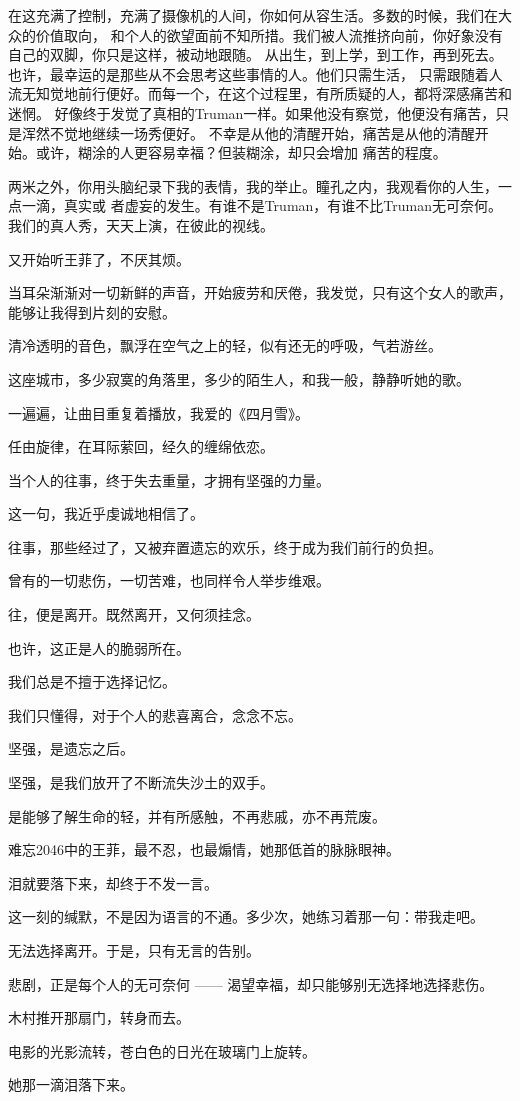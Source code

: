 		在这充满了控制，充满了摄像机的人间，你如何从容生活。多数的时候，我们在大众的价值取向，
	和个人的欲望面前不知所措。我们被人流推挤向前，你好象没有自己的双脚，你只是这样，被动地跟随。
	从出生，到上学，到工作，再到死去。也许，最幸运的是那些从不会思考这些事情的人。他们只需生活，
	只需跟随着人流无知觉地前行便好。而每一个，在这个过程里，有所质疑的人，都将深感痛苦和迷惘。
	好像终于发觉了真相的Truman一样。如果他没有察觉，他便没有痛苦，只是浑然不觉地继续一场秀便好。
	不幸是从他的清醒开始，痛苦是从他的清醒开始。或许，糊涂的人更容易幸福？但装糊涂，却只会增加
	痛苦的程度。

		两米之外，你用头脑纪录下我的表情，我的举止。瞳孔之内，我观看你的人生，一点一滴，真实或
	者虚妄的发生。有谁不是Truman，有谁不比Truman无可奈何。我们的真人秀，天天上演，在彼此的视线。

	\endwriting



		又开始听王菲了，不厌其烦。\par
		当耳朵渐渐对一切新鲜的声音，开始疲劳和厌倦，我发觉，只有这个女人的歌声，能够让我得到片刻的安慰。\par
		清冷透明的音色，飘浮在空气之上的轻，似有还无的呼吸，气若游丝。\par
		这座城市，多少寂寞的角落里，多少的陌生人，和我一般，静静听她的歌。\par
		一遍遍，让曲目重复着播放，我爱的《四月雪》。\par
		任由旋律，在耳际萦回，经久的缠绵依恋。

		当个人的往事，终于失去重量，才拥有坚强的力量。

		这一句，我近乎虔诚地相信了。\par
		往事，那些经过了，又被弃置遗忘的欢乐，终于成为我们前行的负担。\par
		曾有的一切悲伤，一切苦难，也同样令人举步维艰。\par
		往，便是离开。既然离开，又何须挂念。\par
		也许，这正是人的脆弱所在。\par
		我们总是不擅于选择记忆。\par
		我们只懂得，对于个人的悲喜离合，念念不忘。\par
		坚强，是遗忘之后。\par
		坚强，是我们放开了不断流失沙土的双手。\par
		是能够了解生命的轻，并有所感触，不再悲戚，亦不再荒废。

		难忘2046中的王菲，最不忍，也最煽情，她那低首的脉脉眼神。\par
		泪就要落下来，却终于不发一言。\par
		这一刻的缄默，不是因为语言的不通。多少次，她练习着那一句：带我走吧。\par
		无法选择离开。于是，只有无言的告别。\par
		悲剧，正是每个人的无可奈何 —— 渴望幸福，却只能够别无选择地选择悲伤。\par
		木村推开那扇门，转身而去。\par
		电影的光影流转，苍白色的日光在玻璃门上旋转。\par
		她那一滴泪落下来。

